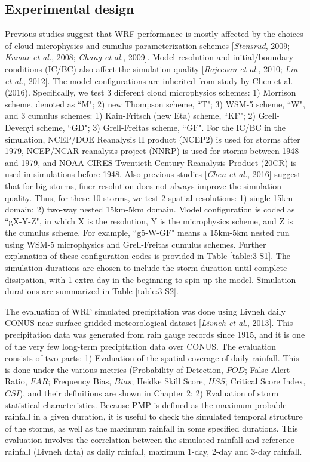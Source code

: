 \subsection{Experimental design}

Previous studies suggest that WRF performance is mostly affected by the choices of cloud microphysics and cumulus parameterization schemes [\textit{Stensrud}, 2009; \textit{Kumar et al.}, 2008; \textit{Chang et al.}, 2009]. Model resolution and initial/boundary conditions (IC/BC) also affect the simulation quality [\textit{Rajeevan et al.}, 2010; \textit{Liu et al.}, 2012]. The model configurations are inherited from study by Chen et al. (2016). Specifically, we test 3 different cloud microphysics schemes: 1) Morrison scheme, denoted as ``M"; 2) new Thompson scheme, ``T"; 3) WSM-5 scheme, ``W", and 3 cumulus schemes: 1) Kain-Fritsch (new Eta) scheme, ``KF"; 2) Grell-Devenyi scheme, ``GD"; 3) Grell-Freitas scheme, ``GF". For the IC/BC in the simulation, NCEP/DOE Reanalysis II product (NCEP2) is used for storms after 1979, NCEP/NCAR reanalysis project (NNRP) is used for storms between 1948 and 1979, and NOAA-CIRES Twentieth Century Reanalysis Product (20CR) is used in simulations before 1948. Also previous studies [\textit{Chen et al.}, 2016] suggest that for big storms, finer resolution does not always improve the simulation quality. Thus, for these 10 storms, we test 2 spatial resolutions: 1) single 15km domain; 2) two-way nested 15km-5km domain. Model configuration is coded as ``gX-Y-Z", in which X is the resolution, Y is the microphysics scheme, and Z is the cumulus scheme. For example, ``g5-W-GF" means a 15km-5km nested run using WSM-5 microphysics and Grell-Freitas cumulus schemes. Further explanation of these configuration codes is provided in Table \ref{table:3-S1}. The simulation durations are chosen to include the storm duration until complete dissipation, with 1 extra day in the beginning to spin up the model. Simulation durations are summarized in Table \ref{table:3-S2}.

The evaluation of WRF simulated precipitation was done using Livneh daily CONUS near-surface gridded meteorological dataset [\textit{Livneh et al.}, 2013]. This precipitation data was generated from rain gauge records since 1915, and it is one of the very few long-term precipitation data over CONUS. The evaluation consists of two parts: 1) Evaluation of the spatial coverage of daily rainfall. This is done under the various metrics (Probability of Detection, $POD$; False Alert Ratio, $FAR$; Frequency Bias, $Bias$; Heidke Skill Score, $HSS$; Critical Score Index, $CSI$), and their definitions are shown in Chapter 2; 2) Evaluation of storm statistical characteristics. Because PMP is defined as the maximum probable rainfall in a given duration, it is useful to check the simulated temporal structure of the storms, as well as the maximum rainfall in some specified durations. This evaluation involves the correlation between the simulated rainfall and reference rainfall (Livneh data) as daily rainfall, maximum 1-day, 2-day and 3-day rainfall.


